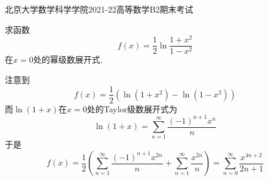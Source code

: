 \documentclass{ctexart}
\begin{document}
\pagestyle{empty}
\begin{center}\Large
    北京大学数学科学学院2021-22高等数学B2期末考试
\end{center}
\begin{problem}[1.(15\songti{分})]
    求函数
    \[f(x)=\dfrac12\ln\dfrac{1+x^2}{1-x^2}\]
    在$x=0$处的幂级数展开式.

\end{problem}
\begin{solution}
    注意到
    \[f(x)=\dfrac{1}{2}\left(\ln(1+x^2)-\ln(1-x^2)\right)\]
    而$\ln(1+x)$在$x=0$处的Taylor级数展开式为
    \[\ln(1+x)=\sum_{n=1}^{\infty}\dfrac{(-1)^{n+1}x^n}{n}\]
    于是
    \[f(x)=\dfrac{1}{2}\left(\sum_{n=1}^{\infty}\dfrac{(-1)^{n+1}x^{2n}}{n}+\sum_{n=1}^{\infty}\dfrac{x^{2n}}{n}\right)
    =\sum_{n=0}^{\infty}\dfrac{x^{4n+2}}{2n+1}\]

\end{solution}
\end{document}
